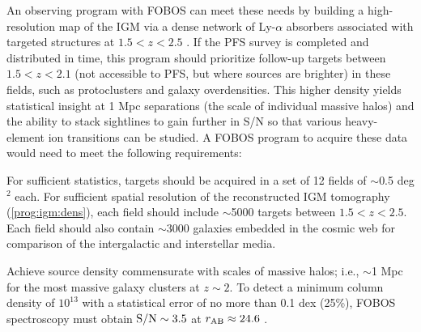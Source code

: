 \documentclass[11pt,a4paper,twoside,onecolumn,openany,final,oldfontcommands]{memoir}
\begin{document}

An observing program with FOBOS can meet these needs by building a high-resolution map of the IGM via a dense network of Ly-$\alpha$ absorbers associated with targeted structures at $1.5 < z < 2.5$ \citep[see][]{lee16}.  If the PFS survey is completed and distributed in time, this program should prioritize follow-up targets between $1.5 < z < 2.1$ (not accessible to PFS, but where sources are brighter) in these fields, such as protoclusters and galaxy overdensities.  This higher density yields statistical insight at 1 Mpc separations (the scale of individual massive halos) and the ability to stack sightlines to gain further in S/N so that various heavy-element ion transitions can be studied.  A FOBOS program to acquire these data would need to meet the following requirements:

\begin{programrequirement}
\reqitem For sufficient statistics, targets should be acquired in a set of 12 fields of $\sim$0.5 deg$^2$ each.
\reqitem For sufficient spatial resolution of the reconstructed IGM tomography (\ref{prog:igm:dens}), each field should include $\sim$5000 targets between $1.5 < z < 2.5$. 
\reqitem Each field should also contain $\sim$3000 galaxies embedded in the cosmic web for comparison of the intergalactic and interstellar media.
\end{programrequirement}

\begin{sciencerequirement}
\reqitem Achieve source density commensurate with scales of massive halos; i.e., $\sim$1 Mpc for the most massive galaxy clusters at $z\sim 2$. \label{prog:igm:dens}
\reqitem To detect a minimum  column density of $10^{13}$  with a statistical error of no more than 0.1 dex (25\%), FOBOS spectroscopy must obtain ${\rm S/N} \sim 3.5$ at $r_{\rm AB} \approx 24.6$ . 
\end{sciencerequirement}

\end{document}
